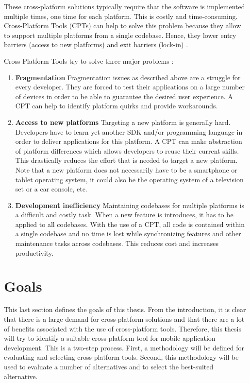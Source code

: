 These cross-platform solutions typically require that the software is implemented multiple times, one time for each platform. This is costly and time-consuming. Cross-Platform Tools (CPTs) can help to solve this problem because they allow to support multiple platforms from a single codebase. Hence, they lower entry barriers (access to new platforms) and exit barriers (lock-in) \cite{VMCPT:2012}. 

Cross-Platform Tools try to solve three major problems \cite{VMCPT:2012}: 

\begin{enumerate}
    \item \textbf{Fragmentation} Fragmentation issues as described above are a struggle for every developer. They are forced to test their applications on a large number of devices in order to be able to guarantee the desired user experience. A CPT can help to identify platform quirks and provide workarounds. 
    \item \textbf{Access to new platforms} Targeting a new platform is generally hard. Developers have to learn yet another SDK and/or programming language in order to deliver applications for this platform. A CPT can make abstraction of platform differences which allows developers to reuse their current skills. This drastically reduces the effort that is needed to target a new platform. Note that a new platform does not necessarily have to be a smartphone or tablet operating system, it could also be the operating system of a television set or a car console, etc.
    \item \textbf{Development inefficiency} Maintaining codebases for multiple platforms is a difficult and costly task. When a new feature is introduces, it has to be applied to all codebases. With the use of a CPT, all code is contained within a single codebase and no time is lost while synchronizing features and other maintenance tasks across codebases. This reduces cost and increases productivity. 
\end{enumerate}

\section{Goals}

This last section defines the goals of this thesis. From the introduction, it is clear that there is a large demand for cross-platform solutions and that there are a lot of benefits associated with the use of cross-platform tools. Therefore, this thesis will try to identify a suitable cross-platform tool for mobile application development. This is a two-step process. First, a methodology will be defined for evaluating and selecting cross-platform tools. Second, this methodology will be used to evaluate a number of alternatives and to select the best-suited alternative.

